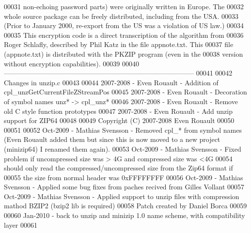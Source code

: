 \begin{DoxyCode}
00031 \textcolor{comment}{  non-echoing password parts) were originally written in Europe.  The}
00032 \textcolor{comment}{  whole source package can be freely distributed, including from the USA.}
00033 \textcolor{comment}{  (Prior to January 2000, re-export from the US was a violation of US law.)}
00034 \textcolor{comment}{}
00035 \textcolor{comment}{        This encryption code is a direct transcription of the algorithm from}
00036 \textcolor{comment}{  Roger Schlafly, described by Phil Katz in the file appnote.txt.  This}
00037 \textcolor{comment}{  file (appnote.txt) is distributed with the PKZIP program (even in the}
00038 \textcolor{comment}{  version without encryption capabilities).}
00039 \textcolor{comment}{}
00040 \textcolor{comment}{        ------------------------------------------------------------------------------------}
00041 \textcolor{comment}{}
00042 \textcolor{comment}{        Changes in unzip.c}
00043 \textcolor{comment}{}
00044 \textcolor{comment}{        2007-2008 - Even Rouault - Addition of cpl\_unzGetCurrentFileZStreamPos}
00045 \textcolor{comment}{  2007-2008 - Even Rouault - Decoration of symbol names unz* -> cpl\_unz*}
00046 \textcolor{comment}{  2007-2008 - Even Rouault - Remove old C style function prototypes}
00047 \textcolor{comment}{  2007-2008 - Even Rouault - Add unzip support for ZIP64}
00048 \textcolor{comment}{}
00049 \textcolor{comment}{        Copyright (C) 2007-2008 Even Rouault}
00050 \textcolor{comment}{}
00051 \textcolor{comment}{}
00052 \textcolor{comment}{        Oct-2009 - Mathias Svensson - Removed cpl\_* from symbol names (Even Rouault added them but since
       this is now moved to a new project (minizip64) I renamed them again).}
00053 \textcolor{comment}{  Oct-2009 - Mathias Svensson - Fixed problem if uncompressed size was > 4G and compressed size was <4G}
00054 \textcolor{comment}{                                should only read the compressed/uncompressed size from the Zip64 format if}
00055 \textcolor{comment}{                                the size from normal header was 0xFFFFFFFF}
00056 \textcolor{comment}{  Oct-2009 - Mathias Svensson - Applied some bug fixes from paches recived from Gilles Vollant}
00057 \textcolor{comment}{        Oct-2009 - Mathias Svensson - Applied support to unzip files with compression mathod BZIP2 (bzip2
       lib is required)}
00058 \textcolor{comment}{                                Patch created by Daniel Borca}
00059 \textcolor{comment}{}
00060 \textcolor{comment}{  Jan-2010 - back to unzip and minizip 1.0 name scheme, with compatibility layer}
00061 \textcolor{comment}{}

\end{DoxyCode}
